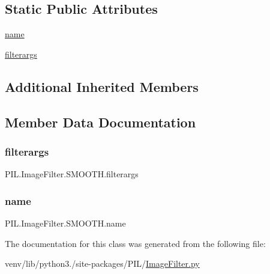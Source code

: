 \subsection*{Static Public Attributes}
\begin{DoxyCompactItemize}
\item 
\hyperlink{classPIL_1_1ImageFilter_1_1SMOOTH_acf62f1eed428dd50688cc4024336a208}{name}
\item 
\hyperlink{classPIL_1_1ImageFilter_1_1SMOOTH_a7e5befb93f41a92ae0a3b302ca8cb222}{filterargs}
\end{DoxyCompactItemize}
\subsection*{Additional Inherited Members}


\subsection{Member Data Documentation}
\mbox{\label{classPIL_1_1ImageFilter_1_1SMOOTH_a7e5befb93f41a92ae0a3b302ca8cb222}} 
\subsubsection{\texorpdfstring{filterargs}{filterargs}}
{\footnotesize\ttfamily P\+I\+L.\+Image\+Filter.\+S\+M\+O\+O\+T\+H.\+filterargs\hspace{0.3cm}{\ttfamily [static]}}

\mbox{\label{classPIL_1_1ImageFilter_1_1SMOOTH_acf62f1eed428dd50688cc4024336a208}} 
\subsubsection{\texorpdfstring{name}{name}}
{\footnotesize\ttfamily P\+I\+L.\+Image\+Filter.\+S\+M\+O\+O\+T\+H.\+name\hspace{0.3cm}{\ttfamily [static]}}



The documentation for this class was generated from the following file\+:\begin{DoxyCompactItemize}
\item 
venv/lib/python3./site-\/packages/\+P\+I\+L/\hyperlink{ImageFilter_8py}{Image\+Filter.\+py}\end{DoxyCompactItemize}
